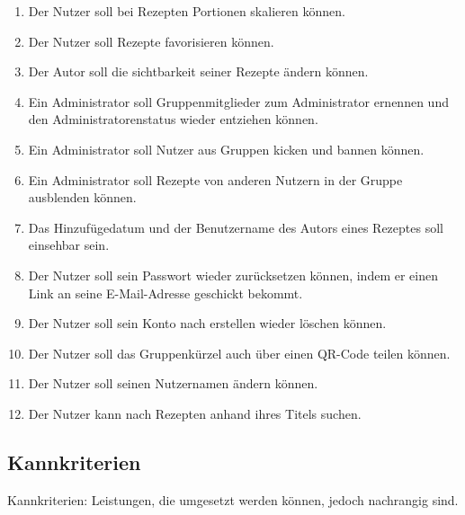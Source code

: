 \documentclass[parskip=full]{scrartcl}
\begin{document}
\begin{enumerate}[start=1,label={$\langle$\bfseries RS\arabic*$\rangle$}, leftmargin = 5em, itemsep=4pt, parsep=4pt]
    \item Der Nutzer soll bei Rezepten Portionen skalieren können.\label{rs:PortionScaling}
    \item Der Nutzer soll Rezepte favorisieren können.\label{rs:RecipeFavourites}
    \item Der Autor soll die \Gls{sichtbarkeit} seiner Rezepte ändern können.\label{rs:RecipeVisibility}
    \item Ein Administrator soll Gruppenmitglieder zum Administrator ernennen und den Administratorenstatus wieder entziehen können.\label{rs:AdminCreation}
    \item Ein Administrator soll Nutzer aus Gruppen \Gls{kicken} und \Gls{bannen} können.\label{rs:Kicking}
    \item Ein Administrator soll Rezepte von anderen Nutzern in der Gruppe ausblenden können.\label{rs:RecipeHiding}
    \item Das Hinzufügedatum und der Benutzername des Autors eines Rezeptes soll einsehbar sein.\label{rs:AuthorAndDate}
    \item Der Nutzer soll sein Passwort wieder zurücksetzen können, indem er einen Link an seine E-Mail-Adresse geschickt bekommt.\label{rs:ResetPassword}
    \item Der Nutzer soll sein Konto nach erstellen wieder löschen können.\label{rs:AccountDeletion}
    \item Der Nutzer soll das Gruppenkürzel auch über einen QR-Code teilen können.\label{rs:QRCode}
    \item Der Nutzer soll seinen Nutzernamen ändern können.\label{rs:ChangeUsername}
    \item Der Nutzer kann nach Rezepten anhand ihres Titels suchen.\label{rs:Searching}

\end{enumerate}

\subsection{Kannkriterien}
Kannkriterien: Leistungen, die umgesetzt werden können, jedoch nachrangig sind.
\end{document}
